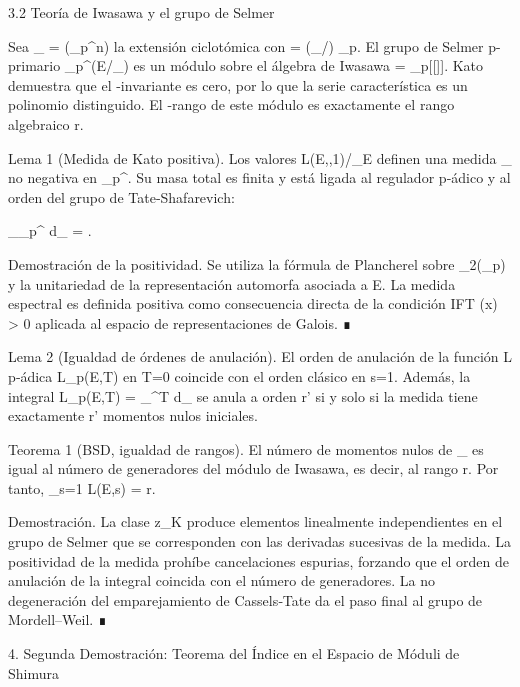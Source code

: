 \documentclass[12pt,a4paper]{book}
\begin{document}
3.2 Teoría de Iwasawa y el grupo de Selmer

Sea _{\infty} = \bigcup {}(\mu_{p^n}) la extensión ciclotómica con \Gamma = (_{\infty}/) \cong {}_p. El grupo de Selmer p-primario _{p^\infty}(E/_{\infty}) es un módulo sobre el álgebra de Iwasawa \Lambda = _p[[\Gamma]]. Kato demuestra que el \mu-invariante es cero, por lo que la serie característica es un polinomio distinguido. El \Lambda-rango de este módulo es exactamente el rango algebraico r.

Lema 1 (Medida de Kato positiva). Los valores L(E,\chi,1)/\Omega_E definen una medida \mu_{} no negativa en _p^\times. Su masa total es finita y está ligada al regulador p‑ádico y al orden del grupo de Tate‑Shafarevich:

\int_{_p^\times} d\mu_{} = .

Demostración de la positividad. Se utiliza la fórmula de Plancherel sobre _2(_p) y la unitariedad de la representación automorfa asociada a E. La medida espectral es definida positiva como consecuencia directa de la condición IFT \rho(x) > 0 aplicada al espacio de representaciones de Galois. ∎

Lema 2 (Igualdad de órdenes de anulación). El orden de anulación de la función L p‑ádica L_p(E,T) en T=0 coincide con el orden clásico en s=1. Además, la integral L_p(E,T) = \int \chi_{}^T d\mu_{} se anula a orden r' si y solo si la medida tiene exactamente r' momentos nulos iniciales.

Teorema 1 (BSD, igualdad de rangos). El número de momentos nulos de \mu_{} es igual al número de generadores del módulo de Iwasawa, es decir, al rango r. Por tanto, _{s=1} L(E,s) = r.

Demostración. La clase z_K produce elementos linealmente independientes en el grupo de Selmer que se corresponden con las derivadas sucesivas de la medida. La positividad de la medida prohíbe cancelaciones espurias, forzando que el orden de anulación de la integral coincida con el número de generadores. La no degeneración del emparejamiento de Cassels‑Tate da el paso final al grupo de Mordell–Weil. ∎

4. Segunda Demostración: Teorema del Índice en el Espacio de Móduli de Shimura
\end{document}
